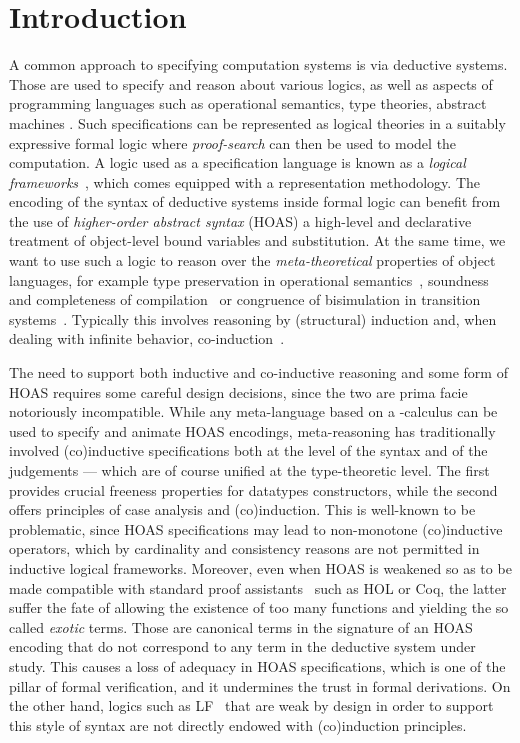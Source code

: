 \documentclass[preprint]{elsarticle}
\begin{document}
\section{Introduction}
\label{sec:intro}

A common approach to specifying computation systems is via deductive
systems. Those are used to specify and reason about various logics, as
well as aspects of programming languages such as operational
semantics, type theories, abstract machines \etc.  Such specifications
can be represented as logical theories in a suitably expressive formal
logic where \emph{proof-search} can then be used to model the
computation.  A logic used as a specification language is known as a
\emph{logical frameworks}~\cite{pfenning01handbook}, which comes
equipped with a representation methodology.  The encoding of the
syntax of deductive systems inside formal logic can benefit from the
use of \emph{higher-order abstract syntax} (HOAS) a high-level and declarative treatment of object-level bound variables
and substitution. At the same time, we want to use such a logic to
reason over the \emph{meta-theoretical} properties of object
languages, for example type preservation in operational
semantics~\cite{mcdowell02tocl}, soundness and completeness of
compilation~\cite{Momigliano03fos} or congruence of bisimulation in
transition systems~\cite{mcdowell03tcs}. Typically this involves
reasoning by (structural) induction and, when dealing with infinite
behavior, co-induction~\cite{Jacobs97}.

The need to support both inductive and co-inductive reasoning and some
form of HOAS requires some careful design decisions, since the two are
prima facie notoriously incompatible. While any meta-language based on
a -calculus can be used to specify and animate HOAS
encodings, meta-reasoning has traditionally involved (co)inductive
specifications both at the level of the syntax and of the judgements
--- which are of course unified at the type-theoretic level. The first
provides crucial freeness properties for datatypes constructors, while
the second offers principles of case analysis and (co)induction. This
is well-known to be problematic, since HOAS specifications may lead to
non-monotone (co)inductive operators, which by cardinality and
consistency reasons are not permitted in inductive logical
frameworks. Moreover, even when HOAS is weakened so as to be made
compatible with standard proof assistants~\cite{despeyroux94lpar} such
as HOL or Coq, the latter suffer the fate of allowing the existence of
too many functions and yielding the so called \emph{exotic}
terms. Those are canonical terms in the signature of an HOAS encoding
that do not correspond to any term in the deductive system under
study. This causes a loss of adequacy in HOAS specifications, which is
one of the pillar of formal verification, and it undermines the trust
in formal derivations. On the other hand, logics such as
LF~\cite{harper93jacm} that are weak by design in order to support this style of syntax are not directly endowed with
(co)induction principles.
\end{document}
